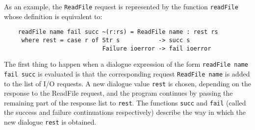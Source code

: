 As an example, the \verb"ReadFile" request  is  represented  by  the  function
\verb"readFile" whose definition is equivalent to:
\begin{verbatim}
    readFile name fail succ ~(r:rs) = ReadFile name : rest rs
     where rest = case r of Str s           -> succ s
                            Failure ioerror -> fail ioerror
\end{verbatim}
The first thing to happen  when  a  dialogue  expression  of  the  form
\verb"readFile name fail succ"  is  evaluated  is  that  the  corresponding
request \verb"ReadFile name" is added to the list of I/O  requests.   A  new
dialogue value \verb"rest" is chosen,  depending  on  the  response  to  the
ReadFile request, and the program continues by  passing  the  remaining
part of the response list to \verb"rest".  
The functions \verb"succ"  and  \verb"fail"
(called the success and failure  continuations  respectively)  describe
the way in which the new dialogue \verb"rest" is obtained.

